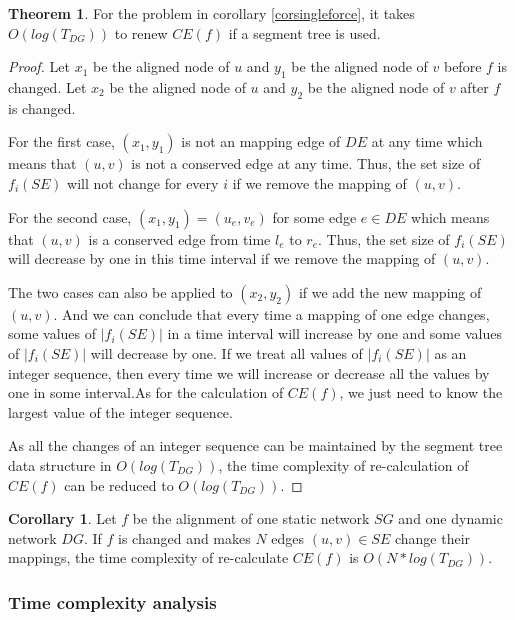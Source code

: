 \documentclass{bioinfo}
\theoremstyle{definition}
\newtheorem{thm}{\textbf{Theorem}}[section]%
\newtheorem{cor}{\textbf{Corollary}}[thm]%
\begin{document}
\begin{thm}
\label{thmsingletree}
For the problem in corollary \ref{corsingleforce}, it takes $O(log(T_{DG}))$ to renew $CE(f)$ if a segment tree is used.
\end{thm}
\begin{proof}
Let $x_1$ be the aligned node of $u$ and $y_1$ be the aligned node of $v$ before $f$ is changed. Let $x_2$ be the aligned node of $u$ and $y_2$ be the aligned node of $v$ after $f$ is changed.

For the first case, $(x_1,y_1)$ is not an mapping edge of $DE$ at any time which means that $(u,v)$ is not a conserved edge at any time. Thus, the set size of $f_i(SE)$ will not change for every $i$ if we remove the mapping of $(u,v)$.

For the second case, $(x_1,y_1)=(u_e,v_e)$ for some edge $e\in DE$ which means that $(u,v)$ is a conserved edge from time $l_e$ to $r_e$. Thus, the set size of $f_i(SE)$ will decrease by one in this time interval if we remove the mapping of $(u,v)$.

The two cases can also be applied to $(x_2,y_2)$ if we add the new mapping of $(u,v)$. And we can conclude that every time a mapping of one edge changes, some values of $|f_i(SE)|$ in a time interval will increase by one and some values of $|f_i(SE)|$ will decrease by one. If we treat all values of $|f_i(SE)|$ as an integer sequence, then every time we will increase or decrease all the values by one in some interval.As for the calculation of $CE(f)$, we just need to know the largest value of the integer sequence.

As all the changes of an integer sequence can be maintained by the segment tree data structure in $O(log(T_{DG}))$, the time complexity of re-calculation of $CE(f)$ can be reduced to $O(log(T_{DG}))$.
\end{proof}

\begin{cor}
\label{corntree}
Let $f$ be the alignment of one static network $SG$ and one dynamic network $DG$. If $f$ is changed and makes $N$ edges $(u,v)\in SE$ change their mappings, the time complexity of re-calculate $CE(f)$ is $O(N*log(T_{DG}))$. 
\end{cor}

\subsubsection{Time complexity analysis} 
\end{document}
